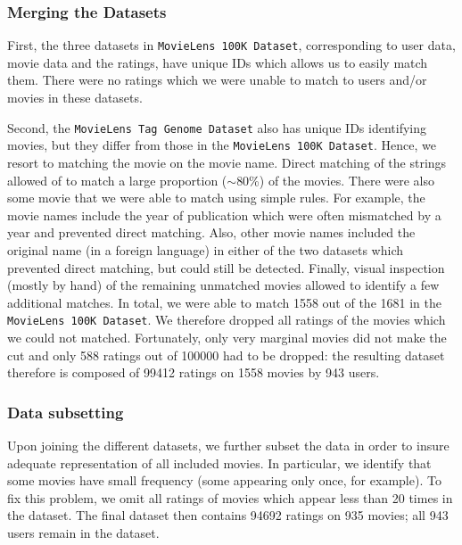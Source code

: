 \documentclass[bj, preprint]{imsart}
\begin{document}
\subsubsection{Merging the Datasets}\label{subsubsec:method.preprocess.merge}

First, the three datasets in \texttt{MovieLens 100K Dataset}, corresponding to user data, movie data and the ratings, have unique IDs which allows us to easily match them. 
There were no ratings which we were unable to match to users and/or movies in these datasets.

Second, the \texttt{MovieLens Tag Genome Dataset} also has unique IDs identifying movies, but they differ from those in the \texttt{MovieLens 100K Dataset}. 
Hence, we resort to matching the movie on the movie name. 
Direct matching of the strings allowed of to match a large proportion ($\sim$80\%) of the movies. 
There were also some movie that we were able to match using simple rules. 
For example, the movie names include the year of publication which were often mismatched by a year and prevented direct matching. 
Also, other movie names included the original name (in a foreign language) in either of the two datasets which prevented direct matching, but could still be detected. 
Finally, visual inspection (mostly by hand) of the remaining unmatched movies allowed to identify a few additional matches.
In total, we were able to match \num{1558} out of the \num{1681} in the \texttt{MovieLens 100K Dataset}. 
We therefore dropped all ratings of the movies which we could not matched. Fortunately, only very marginal movies did not make the cut and only \num{588} ratings out of \num{100000} had to be dropped: the resulting dataset therefore is composed of \num{99412} ratings on \num{1558} movies by \num{943} users. 

\subsubsection{Data subsetting}\label{subsubsec:method.preprocess.subset}

Upon joining the different datasets, we further subset the data in order to insure adequate representation of all included movies. 
In particular, we identify that some movies have small frequency (some appearing only once, for example). 
To fix this problem, we omit all ratings of movies which appear less than 20 times in the dataset. 
The final dataset then contains \num{94692} ratings on \num{935} movies; all \num{943} users remain in the dataset.
\end{document}
